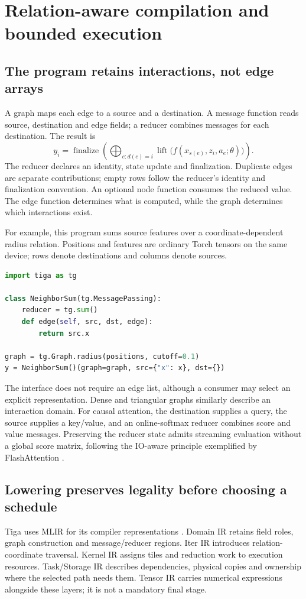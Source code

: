\section{Relation-aware compilation and bounded execution}
\label{ws:design}
\subsection{The program retains interactions, not edge arrays}
A graph maps each edge to a source and a destination. A message function reads
source, destination and edge fields; a reducer combines messages for each
destination. The result is
$$
y_i=\operatorname{finalize}\!\left(
\bigoplus_{e:d(e)=i}\operatorname{lift}
\big(f(x_{s(e)},z_i,a_e;\theta)\big)\right).
$$
The reducer declares an identity, state update and finalization. Duplicate
edges are separate contributions; empty rows follow the reducer's identity
and finalization convention. An optional node function consumes the reduced
value. The edge function determines what is computed, while the graph determines
which interactions exist.

For example, this program sums source features over a coordinate-dependent
radius relation. Positions and features are ordinary Torch tensors on the same
device; rows denote destinations and columns denote sources.
\begin{lstlisting}[language=Python]
import tiga as tg

class NeighborSum(tg.MessagePassing):
    reducer = tg.sum()
    def edge(self, src, dst, edge):
        return src.x

graph = tg.Graph.radius(positions, cutoff=0.1)
y = NeighborSum()(graph=graph, src={"x": x}, dst={})
\end{lstlisting}
The interface does not require an edge list, although a consumer may select an
explicit representation. Dense and triangular graphs similarly describe an
interaction domain. For causal attention, the destination supplies a query,
the source supplies a key/value, and an online-softmax reducer combines score
and value messages. Preserving the reducer state admits streaming evaluation
without a global score matrix, following the IO-aware principle exemplified by
FlashAttention \citep{flashattention}.

\subsection{Lowering preserves legality before choosing a schedule}
Tiga uses MLIR for its compiler representations \citep{mlir}. Domain IR retains
field roles, graph construction and message/reducer regions. Iter IR introduces
relation-coordinate traversal. Kernel IR assigns tiles and reduction work to
execution resources. Task/Storage IR describes dependencies, physical copies
and ownership where the selected path needs them. Tensor IR carries numerical
expressions alongside these layers; it is not a mandatory final stage.

